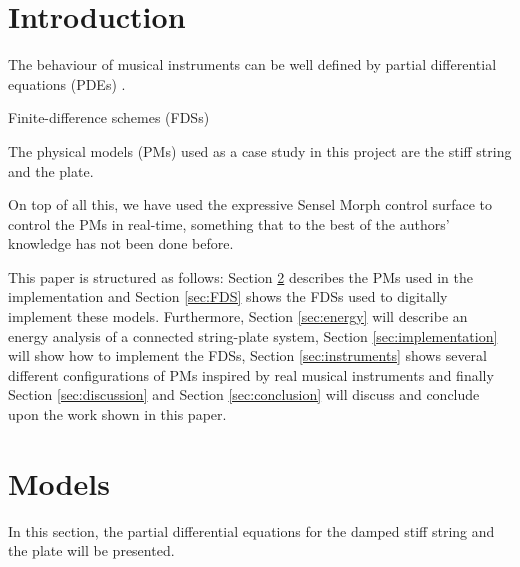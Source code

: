 \documentclass{article}
\title{\papertitle}
\begin{document}
%
\capstartfalse
\maketitle
\capstarttrue
%
\begin{abstract}
Lorum Ipsum
\end{abstract}
%

\section{Introduction}\label{sec:introduction}
The behaviour of musical instruments can be well defined by partial differential equations (PDEs) \cite{Bilbao2018:Tutorial}.

Finite-difference schemes (FDSs)

The physical models (PMs) used as a case study in this project are the stiff string and the plate.

On top of all this, we have used the expressive Sensel Morph \cite{sensel2018} control surface to control the PMs in real-time, something that to the best of the authors' knowledge has not been done before. 

This paper is structured as follows: Section \ref{sec:PDE} describes the PMs used in the implementation and Section \ref{sec:FDS} shows the FDSs used to digitally implement these models. Furthermore, Section \ref{sec:energy} will describe an energy analysis of a connected string-plate system, Section \ref{sec:implementation} will show how to implement the FDSs, Section \ref{sec:instruments} shows several different configurations of PMs inspired by real musical instruments and finally Section \ref{sec:discussion} and Section \ref{sec:conclusion} will discuss and conclude upon the work shown in this paper.

\section{Models}\label{sec:PDE}
In this section, the partial differential equations for the damped stiff string and the plate will be presented. 

\end{document}
